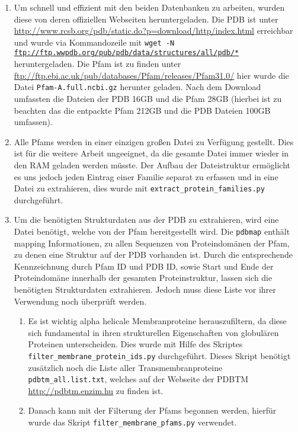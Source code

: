 \begin{enumerate}
\item
    Um schnell und effizient mit den beiden Datenbanken zu arbeiten, wurden diese von deren offiziellen Webseiten heruntergeladen. Die \ac{PDB} ist unter \url{http://www.rcsb.org/pdb/static.do?p=download/http/index.html} erreichbar und wurde via Kommandozeile mit \texttt{wget -N \url{ftp://ftp.wwpdb.org/pub/pdb/data/structures/all/pdb/*}} heruntergeladen. Die \ac{Pfam} ist zu finden unter \url{ftp://ftp.ebi.ac.uk/pub/databases/Pfam/releases/Pfam31.0/} hier wurde die Datei \texttt{Pfam-A.full.ncbi.gz} herunter geladen. Nach dem Download umfassten die Dateien der \ac{PDB} 16GB und die \ac{Pfam} 28GB (hierbei ist zu beachten das die entpackte \ac{Pfam} 212GB und die \ac{PDB} Dateien 100GB umfassen).
\item
    Alle \ac{Pfams} werden in einer einzigen großen Datei zu Verfügung gestellt. Dies ist für die weitere Arbeit ungeeignet, da die gesamte Datei immer wieder in den \ac{RAM} geladen werden müsste. Der Aufbau der Dateistruktur ermöglicht es uns jedoch jeden Eintrag einer Familie separat zu erfassen und in eine Datei zu extrahieren, dies wurde mit \texttt{extract\_protein\_families.py} durchgeführt.
\item
    Um die benötigten Strukturdaten aus der PDB zu extrahieren, wird eine Datei benötigt, welche von der Pfam bereitgestellt wird. Die \texttt{pdbmap} enthält mapping Informationen, zu allen Sequenzen von Proteindomänen der \ac{Pfam}, zu denen eine Struktur auf der \ac{PDB} vorhanden ist. Durch die entsprechende Kennzeichnung durch \ac{Pfam} ID und \ac{PDB} ID, sowie Start und Ende der Proteindomäne innerhalb der gesamten Proteinstruktur, lassen sich die benötigten Strukturdaten extrahieren. Jedoch muss diese Liste vor ihrer Verwendung noch überprüft werden.
    \begin{enumerate}
        \item 
        Es ist wichtig alpha helicale Membranproteine herauszufiltern, da diese sich fundamental in ihren strukturellen Eigenschaften von globulären Proteinen unterscheiden. Dies wurde mit Hilfe des Skriptes \texttt{filter\_membrane\_protein\_ids.py} durchgeführt. Dieses Skript benötigt zusätzlich noch die Liste aller Transmembranproteine \texttt{pdbtm\_all.list.txt}, welches auf der Webseite der \ac{PDBTM} \url{http://pdbtm.enzim.hu} zu finden ist.
        \item
        Danach kann mit der Filterung der \ac{Pfams} begonnen werden, hierfür wurde das Skript \texttt{filter\_membrane\_pfams.py} verwendet.

\end{enumerate}
\end{enumerate}
